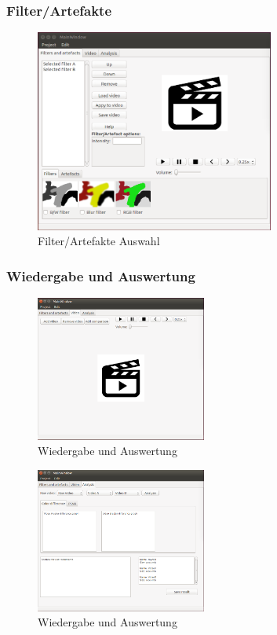 \documentclass[parskip=full]{scrartcl}
\begin{document}
\subsubsection{Filter/Artefakte}
\begin{figure}[htbp] 
\centering
\includegraphics[width=0.7\textwidth]{ToViET/Screenshots/MainWindow_1.png}
\caption{Filter/Artefakte Auswahl}
\end{figure}
\newpage
\subsubsection{Wiedergabe und Auswertung}
\begin{figure}[htbp]
\centering
\includegraphics[width=0.5\textwidth]{ToViET/Screenshots/MainWindow_3.png}
\caption{Wiedergabe und Auswertung}
\end{figure}
\begin{figure}[htbp]
\centering
\includegraphics[width=0.5\textwidth]{ToViET/Screenshots/MainWindow_4.png}
\caption{Wiedergabe und Auswertung}
\end{figure}
\end{document}
